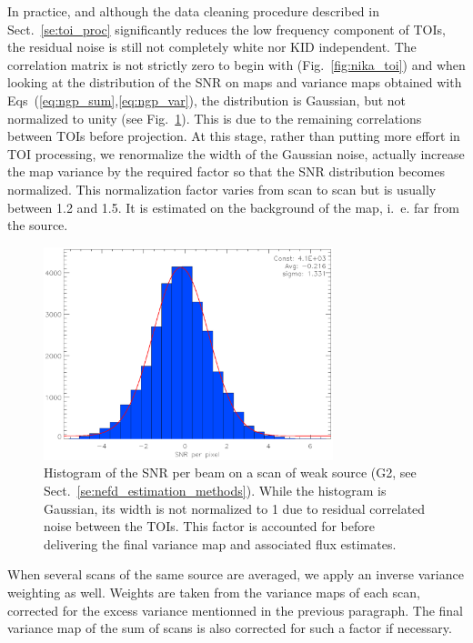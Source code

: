 In practice, and although the data cleaning procedure described in
Sect.~\ref{se:toi_proc} significantly reduces the low frequency component of
TOIs, the residual noise is still not completely white nor KID independent. The
correlation matrix is not strictly zero to begin with (Fig.~\ref{fig:nika_toi})
and when looking at the distribution of the SNR on maps and variance maps
obtained with Eqs~(\ref{eq:ngp_sum},\ref{eq:ngp_var}), the distribution is
Gaussian, but not normalized to unity (see Fig.~\ref{fig:sigma_boost}). This is
due to the remaining correlations between TOIs before projection. At this stage,
rather than putting more effort in TOI processing, we renormalize the width of
the Gaussian noise, actually increase the map variance by the required factor
so that the SNR distribution becomes normalized. This normalization factor
varies from scan to scan but is usually between 1.2 and 1.5. It is estimated on
the background of the map, i.~e. far from the source.

\begin{figure}[ht!]
\begin{center}
\includegraphics[clip, angle=0, scale=1, width=0.75\textwidth]{Figures/sigma_boost.eps}
\caption[Distribution of the SNR per beam]{Histogram of the SNR per beam on a scan of weak source (G2, see
  Sect.~\ref{se:nefd_estimation_methods}). While the histogram is Gaussian, its
  width is not normalized to 1 due to residual correlated noise between the
  TOIs. This factor is accounted for before delivering the final variance map
  and associated flux estimates.}
\label{fig:sigma_boost}
\end{center}
\end{figure}

When several scans of the same source are averaged, we apply an inverse
variance weighting as well. Weights are taken from the variance maps of each scan,
corrected for the excess variance mentionned in the previous paragraph. The
final variance map of the sum of scans is also corrected for such a factor if necessary.

